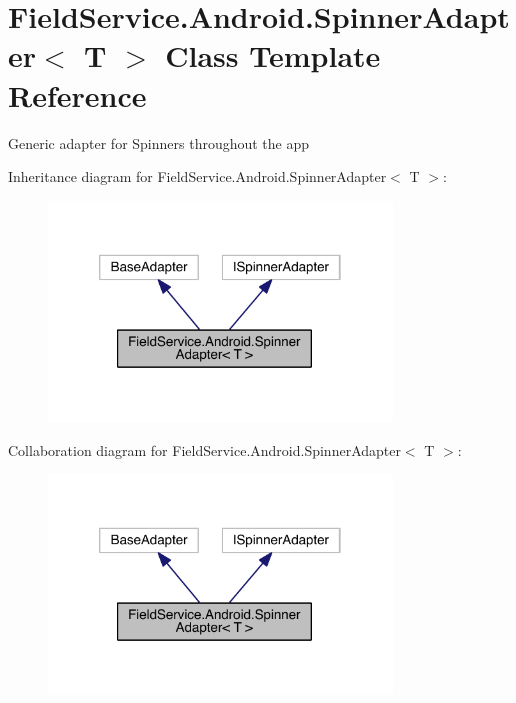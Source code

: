 \hypertarget{class_field_service_1_1_android_1_1_spinner_adapter_3_01_t_01_4}{\section{Field\+Service.\+Android.\+Spinner\+Adapter$<$ T $>$ Class Template Reference}
\label{class_field_service_1_1_android_1_1_spinner_adapter_3_01_t_01_4}
}


Generic adapter for Spinners throughout the app  




Inheritance diagram for Field\+Service.\+Android.\+Spinner\+Adapter$<$ T $>$\+:
\nopagebreak
\begin{figure}[H]
\begin{center}
\leavevmode
\includegraphics[width=259pt]{class_field_service_1_1_android_1_1_spinner_adapter_3_01_t_01_4__inherit__graph}
\end{center}
\end{figure}


Collaboration diagram for Field\+Service.\+Android.\+Spinner\+Adapter$<$ T $>$\+:
\nopagebreak
\begin{figure}[H]
\begin{center}
\leavevmode
\includegraphics[width=259pt]{class_field_service_1_1_android_1_1_spinner_adapter_3_01_t_01_4__coll__graph}
\end{center}
\end{figure}
